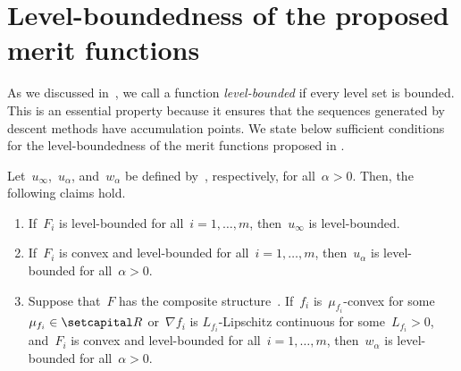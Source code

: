 \documentclass[../main]{subfiles}
\begin{document}
\section{Level-boundedness of the proposed merit functions} 
As we discussed in~, we call a function \emph{level-bounded} if every level set is bounded.
This is an essential property because it ensures that the sequences generated by descent methods have accumulation points.
We state below sufficient conditions for the level-boundedness of the merit functions proposed in .
\begin{theorem} 
    Let~$u_\infty$,~$u_\alpha$, and~$w_\alpha$ be defined by~, respectively, for all~$\alpha > 0$.
    Then, the following claims hold.
    \begin{enumerate}
        \item If~$F_i$ is level-bounded for all~$i = 1, \dots, m$, then~$u_\infty$ is level-bounded. 
        \item If~$F_i$ is convex and level-bounded for all~$i = 1, \dots, m$, then~$u_\alpha$ is level-bounded for all~$\alpha > 0$. 
        \item Suppose that~$F$ has the composite structure~.
              If~$f_i$ is~$\mu_{f_i}$-convex for some~$\mu_{f_i} \in \setR$ or~$\nabla f_i$ is $L_{f_i}$-Lipschitz continuous for some~$L_{f_i} > 0$, and~$F_i$ is convex and level-bounded for all~$i = 1, \dots, m$, then~$w_\alpha$ is level-bounded for all~$\alpha > 0$. 
    \end{enumerate}
\end{theorem}
\end{document}
